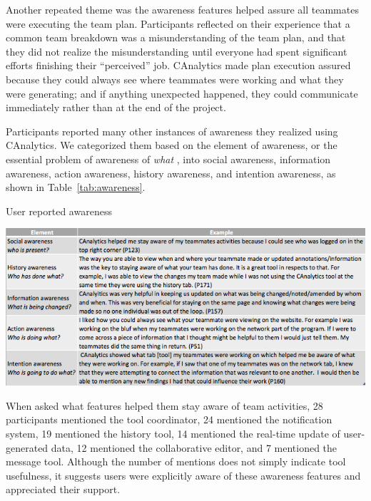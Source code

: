 Another repeated theme was the awareness features helped assure all teammates were executing
the team plan. Participants reflected on their experience that a common
team breakdown was a misunderstanding of the team plan, and that they did
not realize the misunderstanding until everyone had spent significant efforts
finishing their ``perceived'' job. CAnalytics made plan execution assured
because they could always see where teammates were working and what they
were generating; and if anything unexpected happened, they could communicate
immediately rather than at the end of the project.

Participants reported many other instances of awareness they realized
using CAnalytics. We categorized them based on the element of awareness,
or the essential problem of awareness of \emph{what}
\citep{Schmidt2002}, into social awareness, information awareness,
action awareness, history awareness, and intention awareness, as shown
in Table~\ref{tab:awareness}.


\begin{table}
	\caption{User reported awareness}
	\label{tab:awareness}
	\includegraphics[width=\linewidth]{04-Study_one/img/awareness.png}
\end{table}


When asked what features helped them stay aware of team activities, 28
participants mentioned the tool coordinator, 24 mentioned the
notification system, 19 mentioned the history tool, 14 mentioned the
real-time update of user-generated data, 12 mentioned the collaborative
editor, and 7 mentioned the message tool. Although the number of mentions
does not simply indicate tool usefulness, it suggests users were explicitly aware of these awareness features and appreciated their support.


